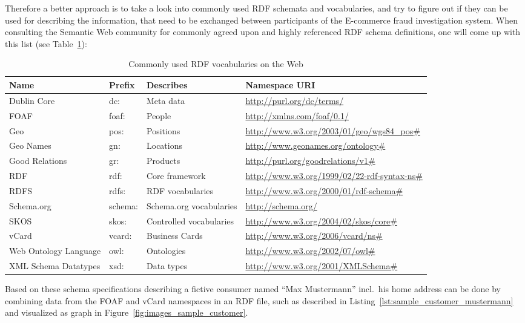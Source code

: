 Therefore a better approach is to take a look into commonly used \gls{RDF} schemata and vocabularies, and try to figure out if they can be used for describing the information, that need to be exchanged between participants of the \gls{E-commerce} fraud investigation system. When consulting the Semantic Web community for commonly agreed upon and highly referenced \gls{RDF} schema definitions, one will come up with this list (see Table~\ref{tab:used_vocab_rdf}):\@

\begin{table}[H]
\centering
\begin{tabular}{p{3cm}llp{4.5cm}}
\hline
\textbf{Name} & \textbf{Prefix} & \textbf{Describes} & \textbf{Namespace URI} \\
\hline
Dublin Core & dc: & Meta data & \url{http://purl.org/dc/terms/} \\
\hline
FOAF & foaf: & People & \url{http://xmlns.com/foaf/0.1/} \\
\hline
Geo & pos: & Positions & \url{http://www.w3.org/2003/01/geo/wgs84\_pos\#} \\
\hline
Geo Names & gn: & Locations & \url{http://www.geonames.org/ontology\#} \\
\hline
Good Relations & gr: & Products & \url{http://purl.org/goodrelations/v1\#} \\
\hline
RDF & rdf: & Core framework & \url{http://www.w3.org/1999/02/22-rdf-syntax-ns\#} \\
\hline
RDFS & rdfs: & RDF vocabularies & \url{http://www.w3.org/2000/01/rdf-schema\#} \\
\hline
Schema.org & schema: & Schema.org vocabularies & \url{http://schema.org/} \\
\hline
SKOS & skos: & Controlled vocabularies & \url{http://www.w3.org/2004/02/skos/core\#} \\
\hline
vCard & vcard: & Business Cards & \url{http://www.w3.org/2006/vcard/ns\#} \\
\hline
Web Ontology Language & owl: & Ontologies & \url{http://www.w3.org/2002/07/owl\#} \\
\hline
XML Schema Datatypes & xsd: & Data types & \url{http://www.w3.org/2001/XMLSchema\#} \\
\hline
\end{tabular}
\caption[Commonly used \gls{RDF} vocabularies on the Web]{Commonly used \gls{RDF} vocabularies on the Web \citep[pg. 41]{wood2014linked}}
\label{tab:used_vocab_rdf}
\end{table}

Based on these schema specifications describing a fictive consumer named ``Max Mustermann'' incl.\ his home address can be done by combining data from the \gls{FOAF} and \gls{vCard} namespaces in an \gls{RDF} file, such as described in Listing~\ref{lst:sample_customer_mustermann} and visualized as graph in Figure~\ref{fig:images_sample_customer}. \@

